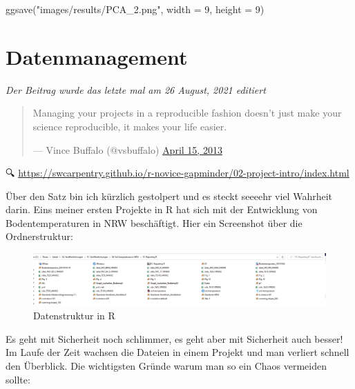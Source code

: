 \documentclass[
]{article}
\newenvironment{Shaded}{\begin{snugshade}}{\end{snugshade}}
\newcommand{\AttributeTok}[1]{\textcolor[rgb]{0.77,0.63,0.00}{#1}}
\newcommand{\DecValTok}[1]{\textcolor[rgb]{0.00,0.00,0.81}{#1}}
\newcommand{\FunctionTok}[1]{\textcolor[rgb]{0.00,0.00,0.00}{#1}}
\newcommand{\NormalTok}[1]{#1}
\newcommand{\StringTok}[1]{\textcolor[rgb]{0.31,0.60,0.02}{#1}}
\begin{document}
\begin{Shaded}
\begin{Highlighting}[]

\FunctionTok{ggsave}\NormalTok{(}\StringTok{"images/results/PCA\_2.png"}\NormalTok{, }\AttributeTok{width =} \DecValTok{9}\NormalTok{, }\AttributeTok{height =} \DecValTok{9}\NormalTok{)}
\end{Highlighting}
\end{Shaded}

\hypertarget{datenmanagement}{%
\section{Datenmanagement}\label{datenmanagement}}

\emph{Der Beitrag wurde das letzte mal am 26 August, 2021 editiert}

\begin{quote}
Managing your projects in a reproducible fashion doesn't just make
your science reproducible, it makes your life easier.

--- Vince Buffalo (@vsbuffalo) \href{https://twitter.com/vsbuffalo/status/323638476153167872}{April 15,
2013}
\end{quote}

🔍 \url{https://swcarpentry.github.io/r-novice-gapminder/02-project-intro/index.html}

Über den Satz bin ich kürzlich gestolpert und es steckt seeeehr viel Wahrheit darin. Eins meiner ersten Projekte in R hat sich mit der Entwicklung von Bodentemperaturen in NRW beschäftigt. Hier ein Screenshot über die Ordnerstruktur:

\begin{figure}

{\centering \includegraphics[width=1\linewidth]{images/049} 

}

\caption{Datenstruktur in R}\label{fig:unnamed-chunk-293}
\end{figure}

Es geht mit Sicherheit noch schlimmer, es geht aber mit Sicherheit auch besser! Im Laufe der Zeit wachsen die Dateien in einem Projekt und man verliert schnell den Überblick. Die wichtigsten Gründe warum man so ein Chaos vermeiden sollte:
\end{document}

